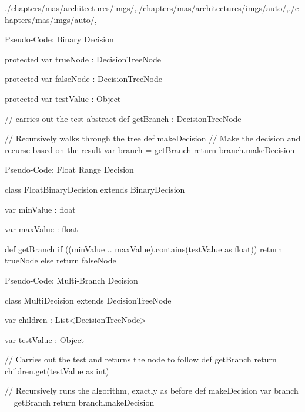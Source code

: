 \begin{graphicspathcontext}{{./chapters/mas/architectures/imgs/},{./chapters/mas/architectures/imgs/auto/},{./chapters/mas/imgs/auto/},\old}
\begin{frame}[fragile]{{Pseudo-Code:} Binary Decision}
\begin{sarllisting}[basicstyle=\scriptsize]
{	protected var trueNode : DecisionTreeNode

	protected var falseNode : DecisionTreeNode

	protected var testValue : Object

	// carries out the test
	abstract def getBranch : DecisionTreeNode
	
	// Recursively walks through the tree
	def makeDecision {
		// Make the decision and recurse based on the result
		var branch = getBranch
		return branch.makeDecision
	}
}
\end{sarllisting}
\end{frame}

\begin{frame}[fragile]{{Pseudo-Code:} Float Range Decision}
\begin{sarllisting}[basicstyle=\scriptsize]
class FloatBinaryDecision extends BinaryDecision {

	var minValue : float

	var maxValue : float

	def getBranch {
		if ((minValue .. maxValue).contains(testValue as float)) {
			return trueNode
		} else {
			return falseNode
		}
	}
}
\end{sarllisting}
\end{frame}

\begin{frame}[fragile]{{Pseudo-Code:} Multi-Branch Decision}
\begin{sarllisting}[basicstyle=\scriptsize]
class MultiDecision extends DecisionTreeNode {

	var children : List<DecisionTreeNode>

	var testValue : Object
	
	// Carries out the test and returns the node to follow
	def getBranch {
		return children.get(testValue as int)
	}
	
	// Recursively runs the algorithm, exactly as before
	def makeDecision {
		var branch = getBranch
		return branch.makeDecision
	}
}
\end{sarllisting}
\end{frame}


\end{graphicspathcontext}
